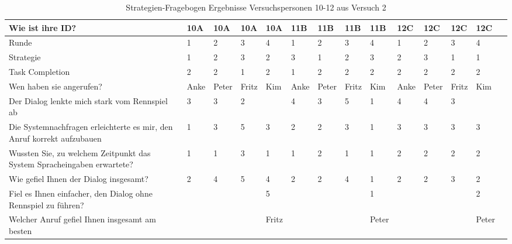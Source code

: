 \documentclass[12pt,a4paper]{scrartcl}
\begin{document}
\begin{appendix}
\begin{table}
\caption{Strategien-Fragebogen Ergebnisse Versuchspersonen 10-12 aus Versuch 2}
\begin{tabular}{|p{6cm}| p{0.8cm} | p{0.8cm} | p{0.8cm} | p{0.8cm} || p{0.8cm} | p{0.8cm} | p{0.8cm} | p{0.8cm} || p{0.8cm} | p{0.8cm} | p{0.8cm} | p{0.8cm} | p{} | }
\hline
	Wie ist ihre ID? & 10A & 10A & 10A & 10A & 11B & 11B & 11B & 11B & 12C & 12C & 12C & 12C \\ \hline \hline
	Runde & 1 & 2 & 3 & 4 & 1 & 2 & 3 & 4 & 1 & 2 & 3 & 4 \\ \hline
	Strategie & 1 & 2 & 3 & 2 & 3 & 1 & 2 & 3 & 2 & 3 & 1 & 1 \\ \hline \hline
	Task Completion & 2 & 2 & 1 & 2 & 1 & 2 & 2 & 2 & 2 & 2 & 2 & 2 \\ \hline \hline
	Wen haben sie angerufen? & Anke & Peter & Fritz & Kim & Anke & Peter & Fritz & Kim & Anke & Peter & Fritz & Kim \\ \hline
	Der Dialog lenkte mich stark vom Rennspiel ab & 3 & 3 & 2 &  & 4 & 3 & 5 & 1 & 4 & 4 & 3 &  \\ \hline
	Die Systemnachfragen erleichterte es mir, den Anruf korrekt aufzubauen & 1 & 3 & 5 & 3 & 2 & 2 & 3 & 1 & 3 & 3 & 3 & 3 \\ \hline
	Wussten Sie, zu welchem Zeitpunkt das System Spracheingaben erwartete? & 1 & 1 & 3 & 1 & 1 & 2 & 1 & 1 & 2 & 2 & 2 & 2 \\ \hline
	Wie gefiel Ihnen der Dialog insgesamt? & 2 & 4 & 5 & 4 & 2 & 2 & 4 & 1 & 2 & 2 & 3 & 2 \\ \hline
	Fiel es Ihnen einfacher, den Dialog ohne Rennspiel zu führen? &  &  &  & 5 &  &  &  & 1 &  &  &  & 2 \\ \hline
	Welcher Anruf gefiel Ihnen insgesamt am besten &  &  &  & Fritz &  &  &  & Peter  &  &  &  & Peter  \\ \hline
\end{tabular}
\end{table}


\end{appendix}
\end{document}
